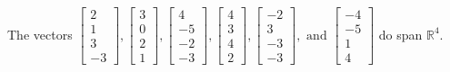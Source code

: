 \begin{exercise}
\begin{exerciseStatement}
  \end{exerciseStatement}
  \begin{exerciseAnswer}
   The vectors \(\left[\begin{array}{r}
2 \\
1 \\
3 \\
-3
\end{array}\right] , \left[\begin{array}{r}
3 \\
0 \\
2 \\
1
\end{array}\right] , \left[\begin{array}{r}
4 \\
-5 \\
-2 \\
-3
\end{array}\right] , \left[\begin{array}{r}
4 \\
3 \\
4 \\
2
\end{array}\right] , \left[\begin{array}{r}
-2 \\
3 \\
-3 \\
-3
\end{array}\right] , \text{ and } \left[\begin{array}{r}
-4 \\
-5 \\
1 \\
4
\end{array}\right]\) 
  	 do  
	span \(\mathbb{R}^4\).
  


  \end{exerciseAnswer}
\end{exercise}